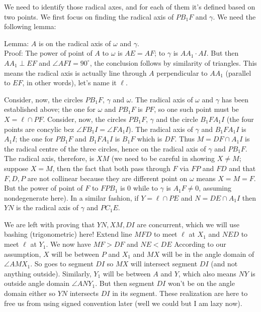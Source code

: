 \documentclass[11pt,a4paper]{article}
\begin{document}
\begin{enumerate}
	We need to identify those radical axes, and for each of them it's defined based on two points. We first focus on finding the radical axis of $PB_1F$ and $\gamma$. We need the following lemma:
	
	Lemma: $A$ is on the radical axis of $\omega$ and $\gamma$.\\
	Proof: The power of point of $A$ to $\omega$ is $AE=AF$; to $\gamma$ is $AA_1\cdot AI$. But then $AA_1\perp EF$ and $\angle AFI=90^{\circ}$, the conclusion follows by similarity of triangles. This means the radical axis is actually line through $A$ perpendicular to $AA_1$ (parallel to $EF$, in other words), let's name it $\ell$.
	
	Consider, now, the circles $PB_1F$, $\gamma$ and $\omega$. The radical axis of $\omega$ and $\gamma$ has been established above; the one for $\omega$ and $PB_1F$ is $PF$, so one such point must be $X=\ell\cap PF$. Consider, now, the circles $PB_1F$, $\gamma$ and the circle $B_1FA_1I$ (the four points are concylic bcz $\angle FB_1I=\angle FA_1I$). The radical axis of $\gamma$ and $B_1FA_1I$ is $A_1I$; the one for $PB_1F$ and $B_1FA_1I$ is $B_1F$ which is $DF$. Thus $M=DF\cap A_1I$ is the radical centre of the three circles, hence on the radical axis of $\gamma$ and $PB_1F$. The radical axis, therefore, is $XM$ (we need to be careful in showing $X\neq M$; suppose $X=M$, then the fact that both pass through $F$ via $FP$ and $FD$ and that $F, D, P$ are not collinear because they are different point on $\omega$ means $X=M=F$. But the power of point of $F$ to $FPB_1$ is 0 while to $\gamma$ is $A_1F\neq 0$, assuming nondegenerate here).
	In a similar fashion, if $Y=\ell\cap PE$ and $N=DE\cap A_1I$ then $YN$ is the radical axis of $\gamma$ and $PC_1E$.
	
	We are left with proving that $YN, XM, DI$ are concurrent, which we will use bashing (trigonometric) here! Extend line $MFD$ to meet $\ell$ at $X_1$ and $NED$ to meet $\ell$ at $Y_1$. We now have $MF>DF$ and $NE<DE$ According to our assumption, $X$ will be between $P$ and $X_1$ and $MX$ will be in the angle domain of $\angle AMX_1$. So goes to segment $DI$ so $MX$ will intersect segment $DI$ (and not anything outside). Similarly, $Y_1$ will be between $A$ and $Y$, which also means $NY$ is outside angle domain $\angle ANY_1$. But then segment $DI$ won't be on the angle domain either so $YN$ intersects $DI$ in its segment. These realization are here to free us from using signed convention later (well we could but I am lazy now).
	

\end{enumerate}
\end{document}
